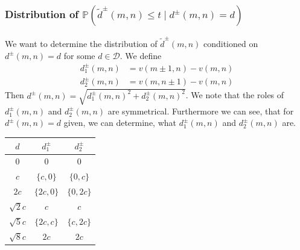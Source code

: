\documentclass{beamer}
\begin{document}
\begin{frame}
	\subsubsection{Distribution of $\mathbb{P}(\tilde{d}^\pm(m, n) \leq t \mid d^\pm(m, n) = d)$}
	
	We want to determine the distribution of $\tilde{d}^\pm(m, n)$ conditioned on $d^\pm(m, n) = d$ for some $d \in \mathcal{D}$. We define
	\begin{align*}
		d_1^\pm(m, n) &= v(m \pm 1, n) - v(m, n) \\
		d_2^\pm(m, n) &= v(m, n \pm 1) - v(m, n)
	\end{align*}
	Then $d^\pm(m, n) = \sqrt{d_1^\pm(m, n)^2 + d_2^\pm(m, n)^2}$. We note that the roles of $d_1^\pm(m, n)$ and $d_2^\pm(m, n)$ are symmetrical. Furthermore we can see, that for $d^\pm(m, n) = d$ given, we can determine, what $d_1^\pm(m, n)$ and $d_2^\pm(m, n)$ are.
\end{frame}

\begin{frame}
	\begin{center}
		\begin{tabular}{c|c|c}
			$d$ & $d_1^\pm$ & $d_2^\pm$ \\
			\hline
			$0$ & $0$ & $0$ \\
			\hline
			$c$ & $\{ c, 0 \}$ & $\{ 0, c \}$ \\
			\hline
			$2 c$ & $\{ 2 c, 0 \}$ & $\{ 0, 2 c \}$ \\
			\hline
			$\sqrt{2} c$ & $c$ & $c$ \\
			\hline
			$\sqrt{5} c$ & $\{ 2 c, c \}$ & $\{ c, 2 c \}$ \\
			\hline
			$\sqrt{8} c$ & $2 c$ & $2 c$ \\
		\end{tabular}
	\end{center}
\end{frame}
\end{document}
